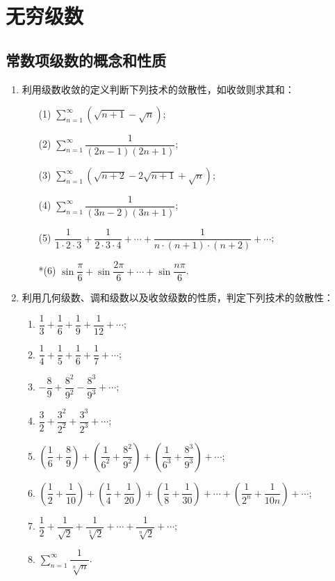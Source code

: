 \chapter{无穷级数}\label{cha:6}

\section{常数项级数的概念和性质}


\begin{enumerate}\setlength{\itemsep}{7pt}
    
\item 利用级数收敛的定义判断下列技术的敛散性，如收敛则求其和：  

\begin{enumerate}\setlength{\itemsep}{8pt}
    \item[(1)] $\displaystyle \sum_{n=1}^{\infty}(\sqrt{n+1}-\sqrt{n})$;
    \item[(2)] $\displaystyle \sum_{n=1}^{\infty}\dfrac{1}{(2n-1)(2n+1)}$;
    \item[(3)] $\displaystyle \sum_{n=1}^{\infty}(\sqrt{n+2}-2\sqrt{n+1}+\sqrt{n})$;
    \item[(4)] $\displaystyle \sum_{n=1}^{\infty}\dfrac{1}{(3n-2)(3n+1)}$;
    \item[(5)] $\dfrac{1}{1\cdot2\cdot3}+\dfrac{1}{2\cdot3\cdot4}+\cdots+\dfrac{1}{n\cdot(n+1)\cdot(n+2)}+\cdots$;
    \item[*(6)] $\sin\dfrac{\pi}{6}+\sin\dfrac{2\pi}{6}+\cdots+\sin\dfrac{n\pi}{6}$.
\end{enumerate}  

\item 利用几何级数、调和级数以及收敛级数的性质，判定下列技术的敛散性：
\begin{enumerate}[(1)]\setlength{\itemsep}{10pt}
    \item $\dfrac{1}{3}+\dfrac{1}{6}+\dfrac{1}{9}+\dfrac{1}{12}+\cdots$;
    \item $\dfrac{1}{4}+\dfrac{1}{5}+\dfrac{1}{6}+\dfrac{1}{7}+\cdots$; 
    \item $-\dfrac{8}{9}+\dfrac{8^2}{9^2}-\dfrac{8^3}{9^3}+\cdots$;
    \item $\dfrac{3}{2}+\dfrac{3^2}{2^2}+\dfrac{3^3}{2^3}+\cdots$;
    \item $\left(\dfrac{1}{6}+\dfrac{8}{9}\right)+\left(\dfrac{1}{6^2}+\dfrac{8^2}{9^2}\right)+\left(\dfrac{1}{6^3}+\dfrac{8^3}{9^3}\right)+\cdots$;
    \item $\left(\dfrac{1}{2}+\dfrac{1}{10}\right)+\left(\dfrac{1}{4}+\dfrac{1}{20}\right)+\left(\dfrac{1}{8}+\dfrac{1}{30}\right)+\cdots+\left(\dfrac{1}{2^n}+\dfrac{1}{10n}\right)+\cdots$;
    \item $\dfrac{1}{2}+\dfrac{1}{\sqrt{2}}+\dfrac{1}{\sqrt[3]{2}}+\cdots+\dfrac{1}{\sqrt[n]{2}}+\cdots$;
    \item $\displaystyle\sum_{n=1}^{\infty}\dfrac{1}{\sqrt[n]{n}}$.
\end{enumerate}
\end{enumerate}
    

